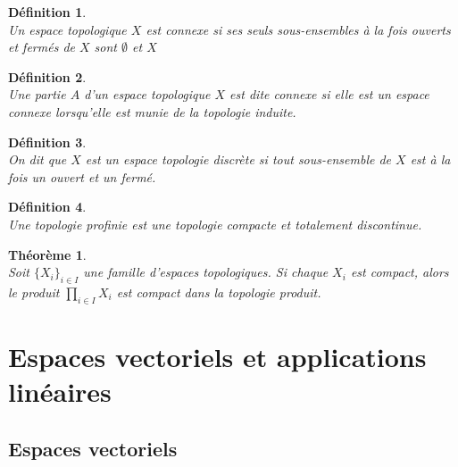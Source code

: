 \documentclass[a4paper, 14pt]{report}
\newtheorem{definition}{Définition}[section]
\newtheorem{theorem}{Théorème}[section]
\begin{document}
\begin{onehalfspace}
{\begin{definition} \cite{bourbaki2013general}\\
Un espace topologique \( X \) est connexe si ses seuls sous-ensembles à la fois ouverts et fermés de \( X \) sont \( \emptyset \) et \( X \)
\end{definition}


\begin{definition} \cite{kuratowski2014topology}\\
Une partie \( A \) d'un espace topologique \( X \) est dite connexe si elle est un espace connexe lorsqu'elle est munie de la topologie induite.
\end{definition}

\begin{definition} \cite{kuratowski2014topology}\\
On dit que \( X \) est un espace topologie discrète si tout sous-ensemble de \( X \) est à la fois un ouvert et un fermé.
\end{definition}

\begin{definition} \cite{bourbaki2013general}\\
Une topologie profinie est une topologie compacte et totalement discontinue.
\end{definition}

\begin{theorem}	\cite{bourbaki2013general}\\
Soit \( \{ X_i \}_{i \in I} \) une famille d'espaces topologiques. Si chaque \( X_i \) est compact, alors le produit \( \prod_{i \in I} X_i \) est compact dans la topologie produit.	
\end{theorem}






\section{Espaces vectoriels et applications linéaires}
\subsection{Espaces vectoriels}

}
\end{onehalfspace}
\end{document}
